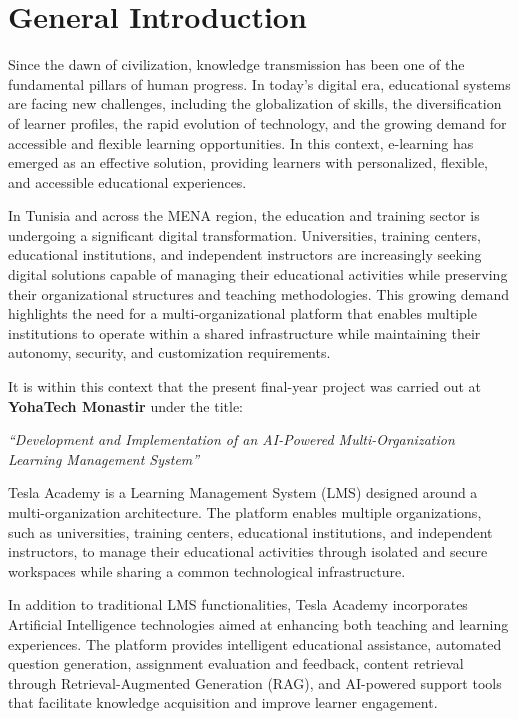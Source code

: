  
\chapter*{General Introduction}

Since the dawn of civilization, knowledge transmission has been one of the fundamental
pillars of human progress. In today's digital era, educational systems are facing new
challenges, including the globalization of skills, the diversification of learner profiles,
the rapid evolution of technology, and the growing demand for accessible and flexible
learning opportunities. In this context, e-learning has emerged as an effective solution,
providing learners with personalized, flexible, and accessible educational experiences.

In Tunisia and across the MENA region, the education and training sector is undergoing a
significant digital transformation. Universities, training centers, educational institutions,
and independent instructors are increasingly seeking digital solutions capable of managing
their educational activities while preserving their organizational structures and teaching
methodologies. This growing demand highlights the need for a multi-organizational platform
that enables multiple institutions to operate within a shared infrastructure while maintaining
their autonomy, security, and customization requirements.

It is within this context that the present final-year project was carried out at
\textbf{YohaTech Monastir} under the title:

\begin{center}
\textit{``Development and Implementation of an AI-Powered Multi-Organization Learning Management System''}
\end{center}
Tesla Academy is a Learning Management System (LMS) designed around a multi-organization architecture. The platform enables multiple organizations, such as universities, training centers, educational institutions, and independent instructors, to manage their educational activities through isolated and secure workspaces while sharing a common technological infrastructure.

In addition to traditional LMS functionalities, Tesla Academy incorporates Artificial
Intelligence technologies aimed at enhancing both teaching and learning experiences. The
platform provides intelligent educational assistance, automated question generation,
assignment evaluation and feedback, content retrieval through Retrieval-Augmented Generation
(RAG), and AI-powered support tools that facilitate knowledge acquisition and improve learner
engagement.


